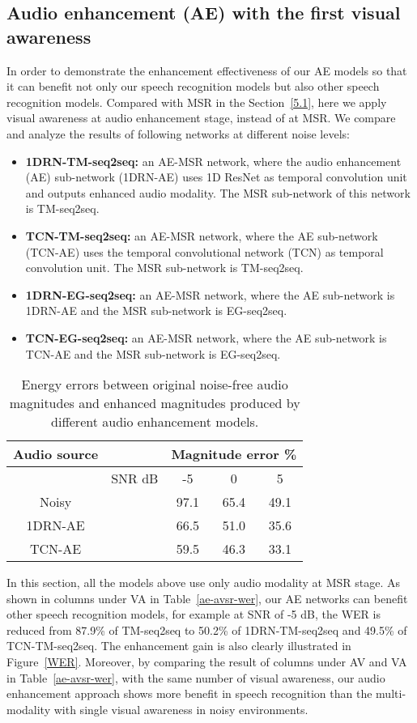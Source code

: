 \documentclass[10pt,twocolumn,letterpaper]{article}
\begin{document}
\subsection{Audio enhancement (AE) with the first visual awareness}\label{experiment_wlc}
In order to demonstrate the enhancement effectiveness of our AE models so that it can benefit not only our speech recognition models but also other speech recognition models. Compared with MSR in the Section~\ref{5.1}, here we apply visual awareness at audio enhancement stage, instead of at MSR. We compare and analyze the results of following
networks at different noise levels:
\begin{itemize}
\item {\bf 1DRN-TM-seq2seq:} an AE-MSR network, where the audio enhancement (AE) sub-network (1DRN-AE) uses 1D ResNet as temporal convolution unit and outputs enhanced audio modality. The MSR sub-network of this network is TM-seq2seq.
\item {\bf TCN-TM-seq2seq:} an AE-MSR network, where the AE sub-network (TCN-AE) uses the temporal convolutional network (TCN) as temporal convolution unit. The MSR sub-network is TM-seq2seq.
\item {\bf 1DRN-EG-seq2seq:} an AE-MSR network, where the AE sub-network is 1DRN-AE and the MSR sub-network is EG-seq2seq.
\item {\bf TCN-EG-seq2seq:} an AE-MSR network, where the AE sub-network is TCN-AE and the MSR sub-network is EG-seq2seq.
\end{itemize}

\begin{table}[t]
\begin{center}
\begin{tabular}{ccccc}
\toprule
{\bf Audio source}& &\multicolumn{3}{c}{\bf Magnitude error \%}\\
\midrule

& SNR dB&-5&0&5\\
\cmidrule(l){2-5}
Noisy &&97.1&65.4&49.1 \\
1DRN-AE &&66.5&51.0&35.6 \\
TCN-AE &&59.5&46.3&33.1\\
\bottomrule
\end{tabular}
\end{center}
\caption{Energy errors between original noise-free audio magnitudes and enhanced magnitudes produced by different audio enhancement models.}
\label{mahgnitude_subtraction}
\vspace{-6pt}
\end{table}
In this section, all the models above use only audio modality at MSR stage. As shown in columns under VA in Table~\ref{ae-avsr-wer}, our AE networks can benefit other speech recognition models, for example at SNR of -5 dB, the WER is reduced from 87.9\% of TM-seq2seq to 50.2\% of 1DRN-TM-seq2seq and 49.5\% of TCN-TM-seq2seq.
The enhancement gain is also clearly illustrated in Figure~\ref{WER}. Moreover, by comparing the result of columns under AV and VA in Table~\ref{ae-avsr-wer}, with the same number of visual awareness, our audio enhancement approach shows more benefit in speech recognition than the multi-modality with single visual awareness in noisy environments.   
\end{document}
